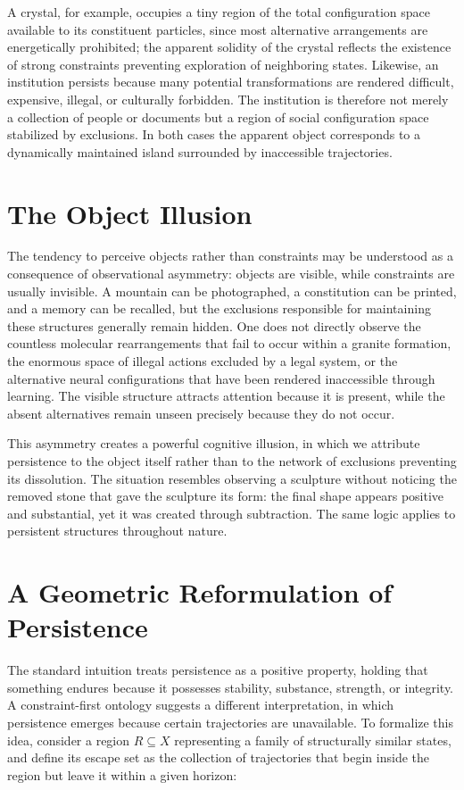 \documentclass[11pt,oneside]{book}
\theoremstyle{plain}
\theoremstyle{definition}
\theoremstyle{remark}
\begin{document}
A crystal, for example, occupies a tiny region of the total configuration space available to its constituent particles, since most alternative arrangements are energetically prohibited; the apparent solidity of the crystal reflects the existence of strong constraints preventing exploration of neighboring states. Likewise, an institution persists because many potential transformations are rendered difficult, expensive, illegal, or culturally forbidden. The institution is therefore not merely a collection of people or documents but a region of social configuration space stabilized by exclusions. In both cases the apparent object corresponds to a dynamically maintained island surrounded by inaccessible trajectories.

\section{The Object Illusion}

The tendency to perceive objects rather than constraints may be understood as a consequence of observational asymmetry: objects are visible, while constraints are usually invisible. A mountain can be photographed, a constitution can be printed, and a memory can be recalled, but the exclusions responsible for maintaining these structures generally remain hidden. One does not directly observe the countless molecular rearrangements that fail to occur within a granite formation, the enormous space of illegal actions excluded by a legal system, or the alternative neural configurations that have been rendered inaccessible through learning. The visible structure attracts attention because it is present, while the absent alternatives remain unseen precisely because they do not occur.

This asymmetry creates a powerful cognitive illusion, in which we attribute persistence to the object itself rather than to the network of exclusions preventing its dissolution. The situation resembles observing a sculpture without noticing the removed stone that gave the sculpture its form: the final shape appears positive and substantial, yet it was created through subtraction. The same logic applies to persistent structures throughout nature.

\section{A Geometric Reformulation of Persistence}

The standard intuition treats persistence as a positive property, holding that something endures because it possesses stability, substance, strength, or integrity. A constraint-first ontology suggests a different interpretation, in which persistence emerges because certain trajectories are unavailable. To formalize this idea, consider a region \(R \subseteq X\) representing a family of structurally similar states, and define its escape set as the collection of trajectories that begin inside the region but leave it within a given horizon:
\end{document}
